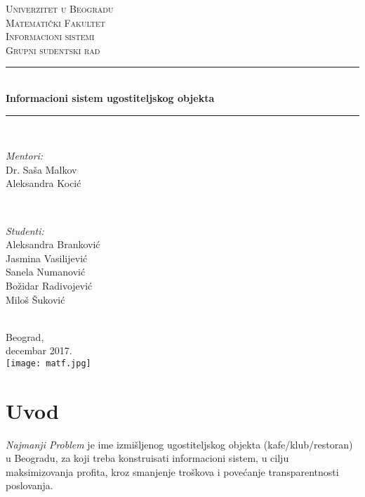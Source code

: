 \documentclass{article}
\begin{document}
\begin{titlepage}
\newcommand{\HRule}{\rule{\linewidth}{0.5mm}} 
\center 

\textsc{\LARGE Univerzitet u Beogradu\\ Matematički Fakultet }\\[1.5cm] 
\textsc{\Large Informacioni sistemi}\\[0.5cm] 
\textsc{\large Grupni sudentski rad}\\[0.5cm] 

\HRule \\[0.4cm]
{ \huge \bfseries Informacioni sistem ugostiteljskog objekta}\\[0.4cm] 
\HRule \\[1.5cm]

\begin{minipage}{0.4\textwidth}
\begin{flushleft} \large
\emph{Mentori:}\\
Dr. Saša Malkov\\
Aleksandra Kocić
\end{flushleft}
\end{minipage}
~
\begin{minipage}{0.4\textwidth}
\begin{flushright} \large
\emph{Studenti:} \\
Aleksandra Branković\\
Jasmina Vasilijević\\
Sanela Numanović\\
Božidar Radivojević\\
Miloš Šuković\\
\end{flushright}
\end{minipage}\\[2cm]


 
{\large Beograd,\\ decembar 2017.}\\[2cm] 
\texttt{[image: matf.jpg]}\\[1cm]
 

\vfill 

\end{titlepage}

\tableofcontents
\newpage


\section{Uvod}
\emph{Najmanji Problem} je ime izmišljenog ugostiteljskog objekta (kafe/klub/restoran) u Beogradu, za koji treba konstruisati informacioni sistem, u cilju maksimizovanja profita, kroz smanjenje troškova i povećanje transparentnosti
poslovanja.\\
\end{document}
